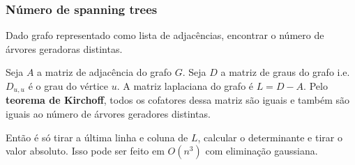 \subsubsection{Número de spanning trees}

Dado grafo representado como lista de adjacências, encontrar o número
de árvores geradoras distintas.

Seja $A$ a matriz de adjacência do grafo $G$. Seja $D$ a matriz de graus do
grafo i.e. $D_{u, u}$ é o grau do vértice $u$. A matriz laplaciana do grafo é
$L = D - A$. Pelo \textbf{teorema de Kirchoff}, todos os cofatores dessa matriz
são iguais e também são iguais ao número de árvores geradores distintas.

Então é só tirar a última linha e coluna de $L$, calcular o determinante e tirar
o valor absoluto. Isso pode ser feito em $O(n^3)$ com eliminação gaussiana.